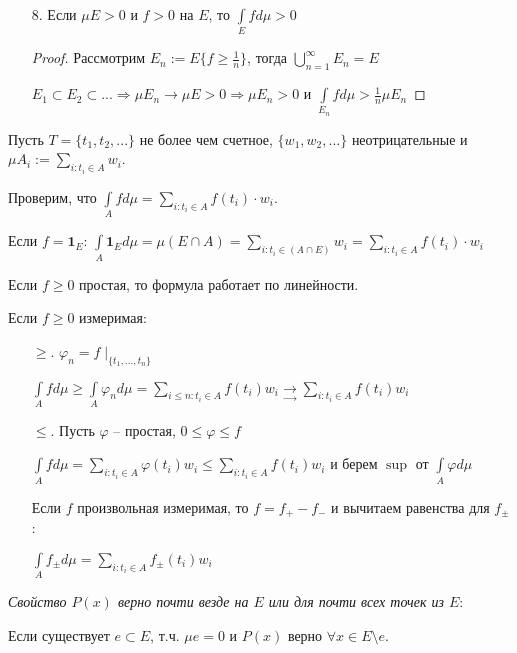 \begin{enumerate}
    \item[8.] Если $\mu E>0$ и $f>0$ на $E$, то $\int\limits_E fd\mu > 0$
    
    \begin{proof}
        Рассмотрим $E_n:=E\{f\geq \frac{1}{n}\}$, тогда $\bigcup\limits_{n=1}^\infty E_n = E$

        $E_1\subset E_2\subset ...\Rightarrow\mu E_n \rightarrow\mu E>0\Rightarrow \mu E_n>0$ и $\int\limits_{E_n} f d\mu > \frac{1}{n}\mu E_n$
    \end{proof}
\end{enumerate}

\begin{example}
    Пусть $T=\{t_1, t_2, ...\}$ не более чем счетное, $\{w_1, w_2, ...\}$ неотрицательные и 
    $\mu A_i := \sum\limits_{i:t_i\in A} w_i$.

    Проверим, что $\int\limits_A fd\mu = \sum\limits_{i:t_i\in A} f(t_i)\cdot w_i$.

    Если $f=\mathbf{1}_E$: $\int\limits_A \mathbf{1}_E d\mu=\mu (E\cap A) =
    \sum\limits_{i:t_i\in (A\cap E)} w_i=\sum\limits_{i:t_i\in A} f(t_i)\cdot w_i$

    Если $f\geq 0$ простая, то формула работает по линейности.

    Если $f\geq 0$ измеримая:

    \begin{enumerate}
        \item[$\geq$.] $\varphi_n = f\mid_{\{t_1, ..., t_n\}}$
        
        $\int\limits_A f d\mu \geq \int\limits_A \varphi_n d\mu =\sum\limits_{i\leq n:t_i\in A} f(t_i)w_i
        \underset{\rightarrow}{\rightarrow} \sum\limits_{i:t_i\in A} f(t_i)w_i$
        
        \item[$\leq$.] Пусть $\varphi$ – простая, $0\leq \varphi \leq f$
        
        $\int\limits_A f d\mu=\sum\limits_{i:t_i\in A}\varphi (t_i)w_i\leq \sum\limits_{i:t_i\in A}f (t_i)w_i$
        и берем $\sup$ от $\int\limits_A \varphi d\mu$

        Если $f$ произвольная измеримая, то $f=f_+-f_-$ и вычитаем равенства для $f_\pm$:

        $\int\limits_A f_\pm d\mu=\sum\limits_{i:t_i\in A}f_\pm (t_i)w_i$
    \end{enumerate}
\end{example}


\begin{definition}
    \textit{Свойство $P(x)$ верно почти везде на $E$ или для почти всех точек из $E$}:

    Если существует $e\subset E$, т.ч. $\mu e=0$ и $P(x)$ верно $\forall x\in E\setminus e$.
\end{definition}

